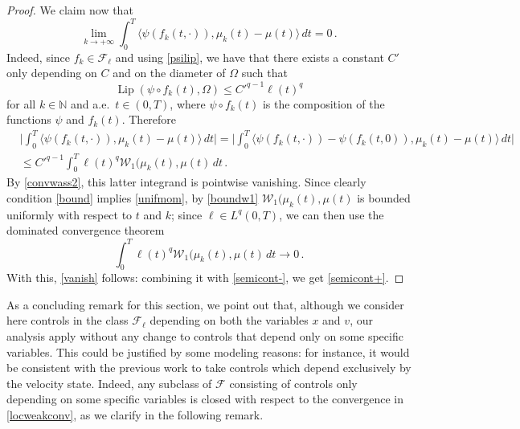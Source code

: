 \documentclass[11pt]{article}
\theoremstyle{plain}
\theoremstyle{definition}
\theoremstyle{remark}
\numberwithin{equation}{section}
\newcommand{\Om}{\Omega}
\newcommand{\N}{\mathbb N}
\begin{document}
\begin{proof}
We claim now that
\begin{equation}\label{vanish}
\lim_{k\to +\infty}\int_0^T \langle \psi(f_k(t,\cdot)), \mu_k(t)-\mu(t) \rangle\,dt=0\,.
\end{equation}
Indeed, since $f_k \in \mathcal F_\ell$ and using \eqref{psilip}, we have that there exists a constant $C'$ only depending on $C$ and on the diameter of $\Om$ such that
$$
\operatorname{Lip}(\psi \circ f_k(t), \Om)\le C'^{q-1}\ell(t)^q
$$
for all $k\in \N$ and a.e.\ $t\in (0,T)$, where $\psi \circ f_k(t)$ is the composition of the functions $\psi$ and $f_k(t)$. Therefore
\begin{eqnarray*}
&\displaystyle
\Big|\int_0^T \langle \psi(f_k(t,\cdot)), \mu_k(t)-\mu(t) \rangle\,dt\Big|=\Big|\int_0^T \langle \psi(f_k(t,\cdot))-\psi(f_k(t,0)), \mu_k(t)-\mu(t) \rangle\,dt\Big|\\
&\displaystyle
\le C'^{q-1}\int_0^T \ell(t)^q \mathcal W_1(\mu_k(t), \mu(t)\,dt\,.
\end{eqnarray*}
By \eqref{convwass2}, this latter integrand is pointwise vanishing. Since clearly condition \eqref{bound} implies \eqref{unifmom}, by \eqref{boundw1} $\mathcal W_1(\mu_k(t), \mu(t)$ is bounded uniformly with respect to $t$ and $k$; since $\ell \in L^q(0,T)$, we can then use the dominated convergence theorem 
$$
\int_0^T \ell(t)^q \mathcal W_1(\mu_k(t), \mu(t)\,dt\to 0\,.
$$
With this, \eqref{vanish} follows: combining it with \eqref{semicont-}, we get \eqref{semicont+}.
\end{proof}

As a concluding remark for this section, we point out that, although we consider here controls in the class $\mathcal F_\ell$ depending on both the variables $x$ and $v$, our analysis apply without any change to controls that depend only on some specific variables. This could be justified by some modeling reasons: for instance, it would be consistent with the previous work \cite{CFPT} to take controls which depend exclusively by the velocity state.
Indeed, any subclass of $\mathcal F$ consisting of controls only depending on some specific variables is closed with respect to the convergence in \eqref{locweakconv}, as we clarify in the following remark.
\end{document}
